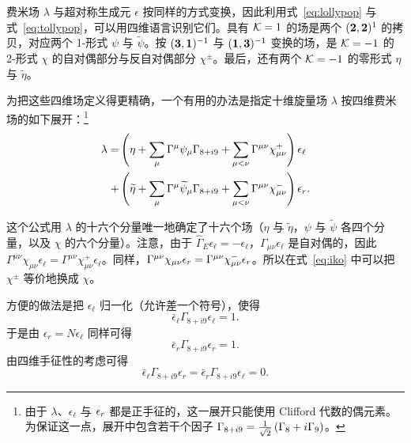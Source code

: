 费米场 $\lambda$ 与超对称生成元 $\epsilon$ 按同样的方式变换，因此利用式~\eqref{eq:lollypop} 与式~\eqref{eq:tollypop}，可以用四维语言识别它们。具有 ${\EUK}=1$ 的场是两个 $({\bf 2},{\bf 2})^1$ 的拷贝，对应两个 1-形式 $\psi$ 与 $\tilde\psi$。按 $({\bf 3},{\bf 1})^{-1}$ 与 $({\bf 1},{\bf 3})^{-1}$ 变换的场，是 ${\EUK}=-1$ 的 2-形式 $\chi$ 的自对偶部分与反自对偶部分 $\chi^\pm$。最后，还有两个 ${\EUK}=-1$ 的零形式 $\eta$ 与 $\tilde\eta$。

为把这些四维场定义得更精确，一个有用的办法是指定十维旋量场 $\lambda$ 按四维费米场的如下展开：\footnote{由于 $\lambda$、$\epsilon_\ell$ 与 $\epsilon_\rr$ 都是正手征的，这一展开只能使用 Clifford 代数的偶元素。为保证这一点，展开中包含若干个因子 $\Gamma_{8+i9}={1\over \sqrt 2}\left(\Gamma_8+ i \Gamma_9\right)$。}
\setcounter{equation}{17}
\begin{equation}\label{eq:iko}
\begin{aligned}\lambda=&\left(\eta
+\sum_\mu\Gamma^\mu\psi_\mu \Gamma_{8+i9}
+\sum_{\mu<\nu}\Gamma^{\mu\nu}\chi^+_{\mu\nu}\right)\epsilon_\ell
\\+& \left(\tilde\eta +\sum_{\mu}\Gamma^\mu\tilde\psi_\mu
\Gamma_{8+i9}+\sum_{
\mu<\nu}\Gamma^{\mu\nu}\chi^-_{\mu\nu}\right)\epsilon_\rr.\\\end{aligned}
\end{equation}

这个公式用 $\lambda$ 的十六个分量唯一地确定了十六个场（$\eta$ 与 $\tilde\eta$，$\psi$ 与 $\tilde\psi$ 各四个分量，以及 $\chi$ 的六个分量）。注意，由于 $\hat\Gamma_E\epsilon_\ell=-\epsilon_\ell$，$\Gamma_{\mu\nu}\epsilon_\ell$ 是自对偶的，因此 $\Gamma^{\mu\nu}\chi_{\mu\nu}\epsilon_\ell=\Gamma^{\mu\nu}\chi^+_{\mu\nu}\epsilon_\ell$。同样，$\Gamma^{\mu\nu}\chi_{\mu\nu}\epsilon_\rr=\Gamma^{\mu\nu}\chi^-_{\mu\nu}\epsilon_\rr$。所以在式~\eqref{eq:iko} 中可以把 $\chi^\pm$ 等价地换成 $\chi$。

方便的做法是把 $\epsilon_\ell$ 归一化（允许差一个符号），使得
\setcounter{equation}{18}
\begin{equation}\label{eq:zomop}
\bar\epsilon_\ell \Gamma_{8+i9}\epsilon_\ell = 1.
\end{equation}
于是由 $\epsilon_r=N\epsilon_\ell$ 同样可得
\setcounter{equation}{19}
\begin{equation}\label{eq:omop}
\bar\epsilon_r\Gamma_{8+i9}\epsilon_r=1.
\end{equation}
由四维手征性的考虑可得
\setcounter{equation}{20}
\begin{equation}\label{eq:tomop}
\bar\epsilon_\ell\Gamma_{8+i9}\epsilon_r
=\bar\epsilon_r\Gamma_{8+i9}\epsilon_\ell=0.
\end{equation}

